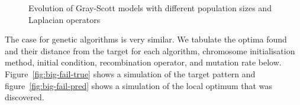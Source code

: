 \begin{figure}[!h]
\centering
            \hfill
            \hfill
            \caption{Evolution of Gray-Scott models with different population sizes and Laplacian operators}
\label{fig:more-fails}
\end{figure}


The case for genetic algorithms is very similar. We tabulate the optima found and their distance from the target for each algorithm, chromosome initialisation method, initial condition, recombination operator, and mutation rate below. Figure~\ref{fig:big-fail-true} shows a simulation of the target pattern and figure~\ref{fig:big-fail-pred} shows a simulation of the local optimum that was discovered.\\

